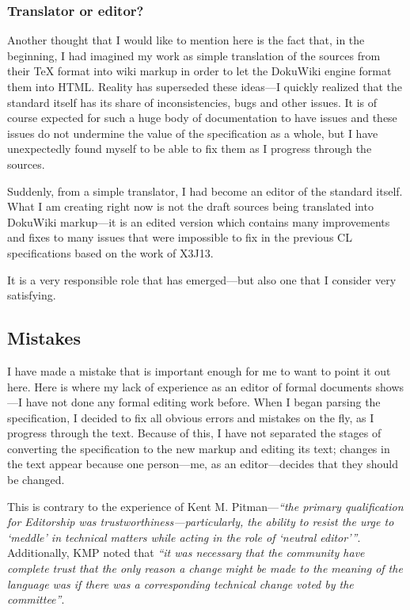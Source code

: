 \subsubsection{Translator or editor?}
Another thought that I would like to mention here is the fact that, in the beginning, I had imagined my work as simple translation of the sources from their \TeX{} format into wiki markup in order to let the DokuWiki engine format them into HTML. Reality has superseded these ideas---I quickly realized that the standard itself has its share of inconsistencies, bugs and other issues. It is of course expected for such a huge body of documentation to have issues and these issues do not undermine the value of the specification as a whole, but I have unexpectedly found myself to be able to fix them as I progress through the sources.

Suddenly, from a simple translator, I had become an editor of the \cl{} standard itself. What I am creating right now is not the draft sources being translated into DokuWiki markup---it is an edited version which contains many improvements and fixes to many issues that were impossible to fix in the previous CL specifications based on the work of X3J13.

It is a very responsible role that has emerged---but also one that I consider very satisfying.

\subsection{Mistakes}

I have made a mistake that is important enough for me to want to point it out here. Here is where my lack of experience as an editor of formal documents shows---I have not done any formal editing work before. When I began parsing the specification, I decided to fix all obvious errors and mistakes on the fly, as I progress through the text. Because of this, I have not separated the stages of converting the specification to the new markup and editing its text; changes in the text appear because one person---me, as an editor---decides that they should be changed.

This is contrary to the experience of Kent M. Pitman---\textit{``the primary qualification for Editorship was trustworthi\-ness---particularly, the ability to resist the urge to `meddle' in technical matters while acting in the role of `neutral editor'''}.\cite{kmp:2012:untold} Additionally, KMP noted that \textit{``it was necessary that the community have complete trust that the only reason a change might be made to the meaning of the language was if there was a corresponding technical change voted by the committee''}.\cite{kmp:2012:untold}

